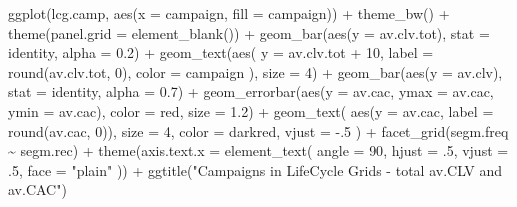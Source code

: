 \documentclass[
]{book}
\newenvironment{Shaded}{\begin{snugshade}}{\end{snugshade}}
\newcommand{\AttributeTok}[1]{\textcolor[rgb]{0.77,0.63,0.00}{#1}}
\newcommand{\DecValTok}[1]{\textcolor[rgb]{0.00,0.00,0.81}{#1}}
\newcommand{\FloatTok}[1]{\textcolor[rgb]{0.00,0.00,0.81}{#1}}
\newcommand{\FunctionTok}[1]{\textcolor[rgb]{0.00,0.00,0.00}{#1}}
\newcommand{\NormalTok}[1]{#1}
\newcommand{\SpecialCharTok}[1]{\textcolor[rgb]{0.00,0.00,0.00}{#1}}
\newcommand{\StringTok}[1]{\textcolor[rgb]{0.31,0.60,0.02}{#1}}
\begin{document}
\begin{Shaded}
\begin{Highlighting}[]
\FunctionTok{ggplot}\NormalTok{(lcg.camp, }\FunctionTok{aes}\NormalTok{(}\AttributeTok{x =}\NormalTok{ campaign, }\AttributeTok{fill =}\NormalTok{ campaign)) }\SpecialCharTok{+}
    \FunctionTok{theme\_bw}\NormalTok{() }\SpecialCharTok{+}
    \FunctionTok{theme}\NormalTok{(}\AttributeTok{panel.grid =} \FunctionTok{element\_blank}\NormalTok{()) }\SpecialCharTok{+}
    \FunctionTok{geom\_bar}\NormalTok{(}\FunctionTok{aes}\NormalTok{(}\AttributeTok{y =}\NormalTok{ av.clv.tot), }\AttributeTok{stat =} \StringTok{\textquotesingle{}identity\textquotesingle{}}\NormalTok{, }\AttributeTok{alpha =} \FloatTok{0.2}\NormalTok{) }\SpecialCharTok{+}
    \FunctionTok{geom\_text}\NormalTok{(}\FunctionTok{aes}\NormalTok{(}
        \AttributeTok{y =}\NormalTok{ av.clv.tot }\SpecialCharTok{+} \DecValTok{10}\NormalTok{,}
        \AttributeTok{label =} \FunctionTok{round}\NormalTok{(av.clv.tot, }\DecValTok{0}\NormalTok{),}
        \AttributeTok{color =}\NormalTok{ campaign}
\NormalTok{    ), }\AttributeTok{size =} \DecValTok{4}\NormalTok{) }\SpecialCharTok{+}
    \FunctionTok{geom\_bar}\NormalTok{(}\FunctionTok{aes}\NormalTok{(}\AttributeTok{y =}\NormalTok{ av.clv), }\AttributeTok{stat =} \StringTok{\textquotesingle{}identity\textquotesingle{}}\NormalTok{, }\AttributeTok{alpha =} \FloatTok{0.7}\NormalTok{) }\SpecialCharTok{+}
    \FunctionTok{geom\_errorbar}\NormalTok{(}\FunctionTok{aes}\NormalTok{(}\AttributeTok{y =}\NormalTok{ av.cac, }\AttributeTok{ymax =}\NormalTok{ av.cac, }\AttributeTok{ymin =}\NormalTok{ av.cac),}
                  \AttributeTok{color =} \StringTok{\textquotesingle{}red\textquotesingle{}}\NormalTok{,}
                  \AttributeTok{size =} \FloatTok{1.2}\NormalTok{) }\SpecialCharTok{+}
    \FunctionTok{geom\_text}\NormalTok{(}
        \FunctionTok{aes}\NormalTok{(}\AttributeTok{y =}\NormalTok{ av.cac, }\AttributeTok{label =} \FunctionTok{round}\NormalTok{(av.cac, }\DecValTok{0}\NormalTok{)),}
        \AttributeTok{size =} \DecValTok{4}\NormalTok{,}
        \AttributeTok{color =} \StringTok{\textquotesingle{}darkred\textquotesingle{}}\NormalTok{,}
        \AttributeTok{vjust =} \SpecialCharTok{{-}}\NormalTok{.}\DecValTok{5}
\NormalTok{    ) }\SpecialCharTok{+}
    \FunctionTok{facet\_grid}\NormalTok{(segm.freq }\SpecialCharTok{\textasciitilde{}}\NormalTok{ segm.rec) }\SpecialCharTok{+}
    \FunctionTok{theme}\NormalTok{(}\AttributeTok{axis.text.x =} \FunctionTok{element\_text}\NormalTok{(}
        \AttributeTok{angle =} \DecValTok{90}\NormalTok{,}
        \AttributeTok{hjust =}\NormalTok{ .}\DecValTok{5}\NormalTok{,}
        \AttributeTok{vjust =}\NormalTok{ .}\DecValTok{5}\NormalTok{,}
        \AttributeTok{face =} \StringTok{"plain"}
\NormalTok{    )) }\SpecialCharTok{+}
    \FunctionTok{ggtitle}\NormalTok{(}\StringTok{"Campaigns in LifeCycle Grids {-} total av.CLV and av.CAC"}\NormalTok{)}
\end{Highlighting}
\end{Shaded}
\end{document}
